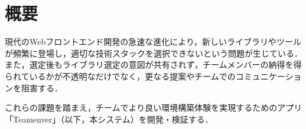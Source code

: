\documentclass[main]{subfiles}
\begin{document}
\section{概要 }
現代のWebフロントエンド開発の急速な進化により，新しいライブラリやツールが頻繁に登場し，適切な技術スタックを選択できないという問題が生じている．
また，選定後もライブラリ選定の意図が共有されず，チームメンバーの納得を得られているかが不透明なだけでなく，更なる提案やチームでのコミュニケーションを阻害する．

これらの課題を踏まえ，チームでより良い環境構築体験を実現するためのアプリ「Teamenver」（以下，本システム）を開発・検証する．
\end{document}
